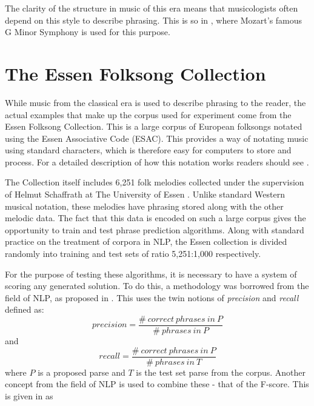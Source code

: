 \documentclass[a4paper,12pt]{article}
\begin{document}
The clarity of the structure in music of this era means that musicologists often depend on this style to describe phrasing. This is so in \cite{Bod_probabilisticgrammars}, where Mozart's famous G Minor Symphony is used for this purpose.




\section{The Essen Folksong Collection}
\label{essensec}

While music from the classical era is used to describe phrasing to the reader, the actual examples that make up the corpus used for experiment come from the Essen Folksong Collection. This is a large corpus of European folksongs notated using the Essen Associative Code (ESAC). This provides a way of notating music using standard characters, which is therefore easy for computers to store and process. For a detailed description of how this notation works readers should see \cite{Bod_probabilisticgrammars}.

The Collection itself includes 6,251 folk melodies collected under the supervision of Helmut Schaffrath at The University of Essen \cite{essen}. Unlike standard Western musical notation, these melodies have phrasing stored along with the other melodic data. The fact that this data is encoded on such a large corpus gives the opportunity to train and test phrase prediction algorithms. Along with standard practice on the treatment of corpora in NLP, the Essen collection is divided randomly into training and test sets of ratio 5,251:1,000 respectively.  

For the purpose of testing these algorithms, it is necessary to have a system of scoring any generated solution. To do this, a methodology was borrowed from the field of NLP, as proposed in \cite{nlp-score}. This uses the twin notions of \emph{precision} and \emph{recall} defined as:
$$precision = \frac{\#\ correct\ phrases\ in\ P}{\#\ phrases\ in\ P} $$
and
$$recall = \frac{\#\ correct\ phrases\ in\ P}{\#\ phrases\ in\ T} $$
where $P$ is a proposed parse and $T$ is the test set parse from the corpus. Another concept from the field of NLP is used to combine these - that of the F-score. This is given in \cite{manning} as
\end{document}
